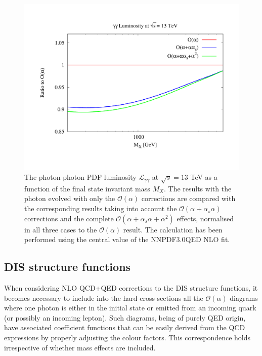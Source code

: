 \begin{figure}[ht]
\centering
\includegraphics[width=\columnwidth]{figs/lumi_13tev.pdf} 
\caption{The photon-photon PDF luminosity $\mathcal{L}_{\gamma\gamma}$
  at $\sqrt{s} = 13$ TeV as a function of the final state invariant
  mass $M_X$. The results with the photon evolved with only the
  $\mathcal{O}(\alpha)$ corrections are compared with the
  corresponding results taking into account the
  $\mathcal{O}(\alpha+\alpha_s\alpha)$ corrections and the complete
  $\mathcal{O}(\alpha+\alpha_s\alpha+\alpha^2)$ effects, normalised in
  all three cases to the $\mathcal{O}(\alpha)$ result. The calculation
  has been performed using the central value of the NNPDF3.0QED NLO
  fit.}\label{fig:GammaGammaLumi}
\end{figure}

\subsection{DIS structure functions}

When considering NLO QCD+QED corrections to the DIS structure
functions, it becomes necessary to include into the hard cross
sections all the $\mathcal{O}(\alpha)$ diagrams where one photon is
either in the initial state or emitted from an incoming quark (or
possibly an incoming lepton). Such diagrams, being of purely QED
origin, have associated coefficient functions that can be easily
derived from the QCD expressions by properly adjusting the colour
factors. This correspondence holds irrespective of whether mass
effects are included.

